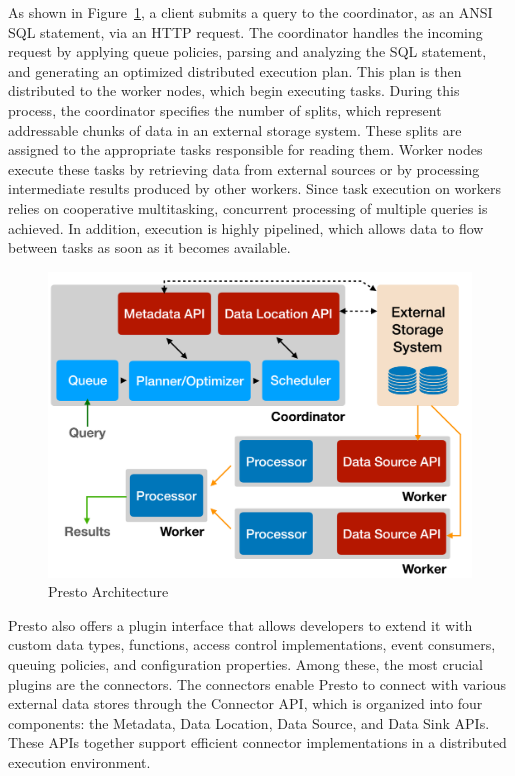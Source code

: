 \documentclass[conference]{IEEEtran}
\begin{document}
As shown in Figure~\ref{fig:presto-arch}, a client submits a query to the coordinator, as an ANSI SQL statement, via an HTTP request. The coordinator handles the incoming request by applying queue policies, parsing and analyzing the SQL statement, and generating an optimized distributed execution plan. This plan is then distributed to the worker nodes, which begin executing tasks. During this process, the coordinator specifies the number of splits, which represent addressable chunks of data in an external storage system. These splits are assigned to the appropriate tasks responsible for reading them. Worker nodes execute these tasks by retrieving data from external sources or by processing intermediate results produced by other workers. Since task execution on workers relies on cooperative multitasking, concurrent processing of multiple queries is achieved. In addition, execution is highly pipelined, which allows data to flow between tasks as soon as it becomes available.

\begin{figure}[htbp]
    \centering
    \includegraphics[width=\linewidth, keepaspectratio]{figures/presto-architecture.png}
    \caption{Presto Architecture \cite{b3}}
    \label{fig:presto-arch}
\end{figure}

Presto also offers a plugin interface that allows developers to extend it with custom data types, functions, access control implementations, event consumers, queuing policies, and configuration properties. Among these, the most crucial plugins are the connectors. The connectors enable Presto to connect with various external data stores through the Connector API, which is organized into four components: the Metadata, Data Location, Data Source, and Data Sink APIs. These APIs together support efficient connector implementations in a distributed execution environment.
\end{document}
